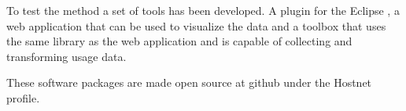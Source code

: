 To test the method a set of tools has been developed. A plugin for the Eclipse \ide, a web application that can be used to visualize the data and a \cli toolbox that uses the same library as the web application and is capable of collecting and transforming usage data.

These software packages are made open source at github under the Hostnet profile.